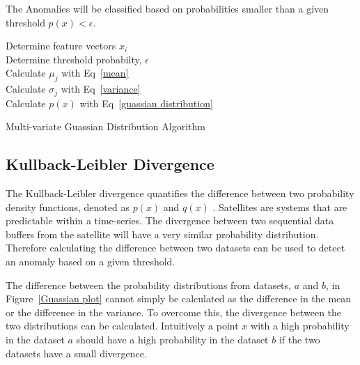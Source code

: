 The Anomalies will be classified based on probabilities smaller than a given threshold $p(x) < \epsilon$.

\begin{algorithm}
	
	
	\Indm
	\Indp
	\BlankLine
	
	Determine feature vectors $x_i$ \\
	Determine threshold probabilty, $\epsilon$ \\
	Calculate $\mu_j$ with Eq~\ref{mean} \\
	Calculate $\sigma_j$ with Eq~\ref{variance} \\
	Calculate $p(x)$ with Eq~\ref{guassian distribution} \\
	
	\caption[Multi-variate Guassian Distribution]{Multi-variate Guassian Distribution Algorithm}
	\label{alg}
\end{algorithm}

\subsection{Kullback-Leibler Divergence}
The Kullback-Leibler divergence quantifies the difference between two probability density functions, denoted as $p(x)$ and $q(x)$ \cite{hershey2007approximating}. Satellites are systems that are predictable within a time-series. The divergence between two sequential data buffers from the satellite will have a very similar probability distribution. Therefore calculating the difference between two datasets can be used to detect an anomaly based on a given threshold.

The difference between the probability distributions from datasets, $a$ and $b$, in Figure~\ref{Guassian plot} cannot simply be calculated as the difference in the mean or the difference in the variance. To overcome this, the divergence between the two distributions can be calculated. Intuitively a point $x$ with a high probability in the dataset $a$ should have a high probability in the dataset $b$ if the two datasets have a small divergence. 

